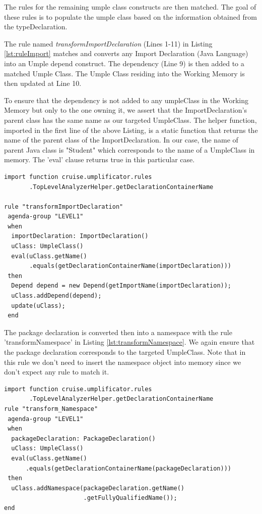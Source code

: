 The rules for the remaining umple class constructs are then matched. The goal of these rules is to populate the umple class based on the information obtained from the typeDeclaration. 

The rule named \textit{transformImportDeclaration} (Lines 1-11) in Listing \ref{lst:ruleImport} matches and converts any Import Declaration (Java Language) into an Umple depend construct. The dependency (Line 9) is then added to a matched Umple Class. The Umple Class residing into the Working Memory is then updated at Line 10.

To ensure that the dependency is not added to any umpleClass in the Working Memory but only to the one owning it, we assert that the ImportDeclaration's parent class has the same name as our targeted UmpleClass. The helper function, imported in the first line of the above Listing, is a static function that returns the name of the parent class of the ImportDeclaration. In our case, the name of parent Java class is "Student" which corresponds to the name of a UmpleClass in memory. The 'eval' clause returns true in this particular case.

\begin{lstlisting}[language={drools},label={lst:ruleImport}, caption=Rule transformImportDeclaration]
import function cruise.umplificator.rules
       .TopLevelAnalyzerHelper.getDeclarationContainerName
      
rule "transformImportDeclaration"
 agenda-group "LEVEL1" 
 when
  importDeclaration: ImportDeclaration()
  uClass: UmpleClass()
  eval(uClass.getName()
       .equals(getDeclarationContainerName(importDeclaration)))		
 then
  Depend depend = new Depend(getImportName(importDeclaration));
  uClass.addDepend(depend);
  update(uClass);
 end
\end{lstlisting}

The package declaration is converted then into a namespace with the rule 'transformNamespace' in Listing \ref{lst:transformNamespace}. We again ensure that the package declaration corresponds to the targeted UmpleClass. Note that in this rule we don't need to insert the namespace object into memory since we don't expect any rule to match it.

\begin{lstlisting}[language={drools},label={lst:transformNamespace}, caption=Rule transformNamespace]
import function cruise.umplificator.rules
       .TopLevelAnalyzerHelper.getDeclarationContainerName
rule "transform_Namespace"
 agenda-group "LEVEL1" 
 when
  packageDeclaration: PackageDeclaration()
  uClass: UmpleClass()
  eval(uClass.getName()
      .equals(getDeclarationContainerName(packageDeclaration)))	
 then
  uClass.addNamespace(packageDeclaration.getName()
                      .getFullyQualifiedName());
end
\end{lstlisting}

